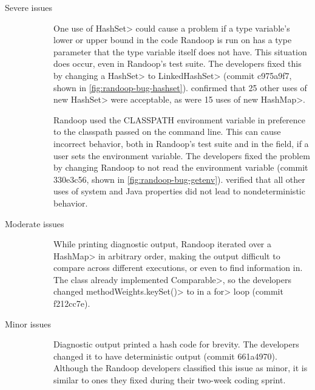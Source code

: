\begin{description}
\item[Severe issues]
  \strut
\begin{description}
\item[\bugHashSet]
One use of \<HashSet> could cause a problem if a type variable's lower or upper
bound in the code Randoop is run on has a type parameter that the type variable itself does not have.
This situation does occur, even in Randoop's test suite.
The developers fixed this by changing a \<HashSet> to \<LinkedHashSet>
(commit c975a9f7, shown in \cref{fig:randoop-bug-hashset}).
\TheDeterminismChecker confirmed that 
25 other uses of \<new HashSet> were acceptable, as were 15 uses of \<new HashMap>.

\item[\bugClasspath]
Randoop used the CLASSPATH environment variable in preference to the
classpath passed on the command line.
This can cause incorrect behavior, both in Randoop's test suite and in the field,
if a user sets the environment variable.
The developers fixed the problem by changing Randoop to not read the environment variable
(commit 330e3c56, shown in \cref{fig:randoop-bug-getenv}).
\TheDeterminismChecker verified that all other uses of system and Java
properties did not lead to nondeterministic behavior.
\end{description}

\item[Moderate issues]
  \strut
\begin{description}
\item[\bugHashMapOutput]
While printing diagnostic output, Randoop iterated over a \<HashMap> in
arbitrary order, making the output difficult to compare across different
executions, or even to find information in.
The class already implemented \<Comparable>, so
the developers changed \<methodWeights.keySet()> to
 in a \<for> loop (commit
f212cc7e).
\end{description}

\item[Minor issues]
\strut
\begin{description}
 
\item[\bugHashcodeOutput]
  Diagnostic output printed a hash code for brevity.
  The developers changed it to have deterministic output (commit 661a4970).
  Although the Randoop developers classified this issue as minor, it is
  similar to ones they fixed during their two-week coding sprint.


\end{description}
\end{description}
